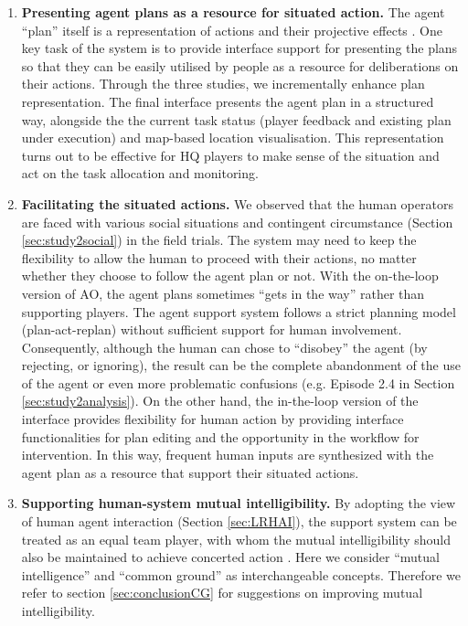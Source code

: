 \begin{enumerate}
\item \textbf{Presenting agent plans as a resource for situated action.} The agent ``plan'' itself is a representation of actions and their projective effects \citep{Suchman1987}. One key task of the system is to provide interface support for presenting the plans so that they can be easily utilised by people as a resource for deliberations on their actions. Through the three studies, we incrementally enhance plan representation. The final interface presents the agent plan in a structured way,  alongside the the current task status (player feedback and existing plan under execution) and map-based location visualisation. This representation turns out to be effective for HQ players to make sense of the situation and act on the task allocation and monitoring.\\

\item \textbf{Facilitating the situated actions.} We observed that the human operators are faced with various social situations and contingent circumstance (Section \ref{sec:study2social}) in the field trials. The system may need to keep the flexibility to allow the human to proceed with their actions, no matter whether they choose to follow the agent plan or not. With the on-the-loop version of \ac{AO}, the agent plans sometimes ``gets in the way'' rather than supporting players. The agent support system follows a strict planning model (plan-act-replan) without sufficient support for human involvement. Consequently, although the human can chose to ``disobey'' the agent (by rejecting, or ignoring), the result can be the complete abandonment of the use of the agent or even more problematic confusions (e.g. Episode 2.4 in Section \ref{sec:study2analysis}). On the other hand, the in-the-loop version of the interface provides flexibility for human action by providing interface functionalities for plan editing and the opportunity in the workflow for intervention. In this way, frequent human inputs are synthesized with the agent plan as a resource that support their situated actions. \\

\item \textbf{Supporting human-system mutual intelligibility.} By adopting the view of human agent interaction (Section \ref{sec:LRHAI}), the support system can be treated as an equal team player, with whom the mutual intelligibility should also be maintained to achieve concerted action \citep{Suchman1987}. Here we consider ``mutual intelligence'' and ``common ground'' as interchangeable concepts.  Therefore we refer to section \ref{sec:conclusionCG} for suggestions on improving mutual intelligibility. \\
\end{enumerate}

